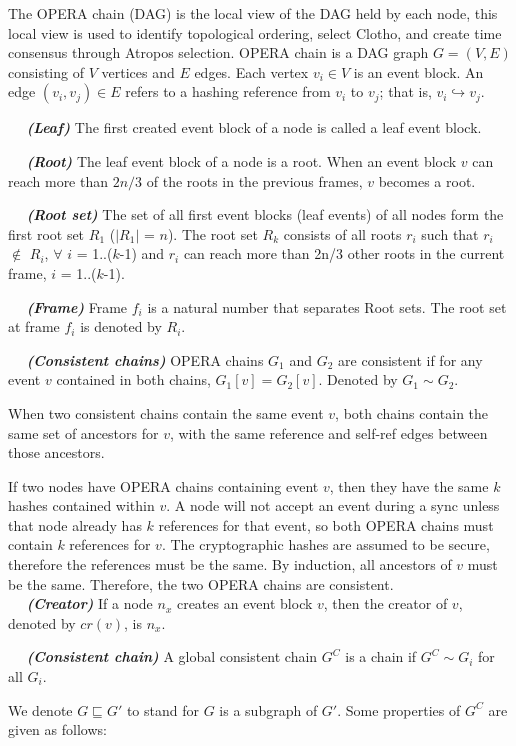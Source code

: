 \documentclass{article}
\newcommand{\dfnn}[2]{$\quad$ \textbf{\emph{(#1)}} {#2}}
\newcommand{\erefz}{\hookrightarrow}
\begin{document}
The OPERA chain (DAG) is the local view of the DAG held by each node, this local view is used to identify topological ordering, select Clotho, and create time consensus through Atropos selection.
OPERA chain is a DAG graph $G = (V, E)$ consisting of $V$ vertices and $E$ edges. Each vertex $v_i \in V$ is an event block. An edge $(v_i,v_j) \in E$ refers to a hashing reference from $v_i$ to $v_j$; that is, $v_i \erefz v_j$.

\dfnn{Leaf}{The first created event block of a node is called a leaf event block.}

\dfnn{Root}{The leaf event block of a node is a root. When an event block $v$ can reach more than $2n/3$ of the roots in the previous frames, $v$ becomes a root.}

\dfnn{Root set}{The set of all first event blocks (leaf events) of all nodes form the first root set $R_1$ ($|R_1|$ = $n$). The root set $R_k$ consists of all roots $r_i$ such that $r_i$ $\not \in $ $R_i$, $\forall$ $i$ = 1..($k$-1) and $r_i$ can reach more than 2n/3 other roots in the current frame, $i$ = 1..($k$-1).}

\dfnn{Frame}{Frame $f_i$ is a natural number that separates Root sets. The root set at frame $f_i$ is denoted by $R_i$.}

\dfnn{Consistent chains}{OPERA chains $G_1$ and $G_2$ are consistent if for any event $v$ contained in both chains, $G_1[v] = G_2[v]$. Denoted by $G_1 \sim G_2$.}

When two consistent chains contain the same event $v$, both chains contain the same set of ancestors for $v$, with the same reference and self-ref edges between those ancestors.

If two nodes have OPERA chains containing event $v$, then they have the same $k$ hashes contained within $v$. A node will not accept an event during a sync unless that node already has $k$ references for that event, so both OPERA chains must contain $k$ references for $v$. The cryptographic hashes are assumed to be secure, therefore the references must be the same. By induction, all ancestors of $v$ must be the same. Therefore, the two OPERA chains are consistent.\\

\dfnn{Creator}{If a node $n_x$ creates an event block $v$, then the creator of $v$, denoted by $cr(v)$, is $n_x$.}

\dfnn{Consistent chain}{A global consistent chain $G^C$ is a chain if $G^C \sim G_i$ for all $G_i$.}

We denote $G \sqsubseteq G'$ to stand for $G$ is a subgraph of $G'$. Some properties of $G^C$ are given as follows:
\end{document}
